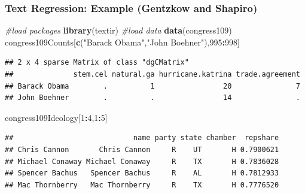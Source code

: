 \documentclass[
  shownotes,
  xcolor={svgnames},
  hyperref={colorlinks,citecolor=DarkBlue,linkcolor=DarkRed,urlcolor=DarkBlue}
  , aspectratio=169]{beamer}
\newenvironment{Shaded}{\begin{snugshade}}{\end{snugshade}}
\newcommand{\CommentTok}[1]{\textcolor[rgb]{0.56,0.35,0.01}{\textit{#1}}}
\newcommand{\DecValTok}[1]{\textcolor[rgb]{0.00,0.00,0.81}{#1}}
\newcommand{\KeywordTok}[1]{\textcolor[rgb]{0.13,0.29,0.53}{\textbf{#1}}}
\newcommand{\NormalTok}[1]{#1}
\newcommand{\OperatorTok}[1]{\textcolor[rgb]{0.81,0.36,0.00}{\textbf{#1}}}
\newcommand{\StringTok}[1]{\textcolor[rgb]{0.31,0.60,0.02}{#1}}
\begin{document}
\begin{frame}[fragile]
\frametitle{Text Regression: Example (Gentzkow and Shapiro)}
\begin{scriptsize}



\begin{Shaded}
\begin{Highlighting}[]
\CommentTok{\#load packages}
\KeywordTok{library}\NormalTok{(textir) }
\CommentTok{\#load data}
\KeywordTok{data}\NormalTok{(congress109)}
\NormalTok{congress109Counts[}\KeywordTok{c}\NormalTok{(}\StringTok{"Barack Obama"}\NormalTok{,}\StringTok{"John Boehner"}\NormalTok{),}\DecValTok{995}\OperatorTok{:}\DecValTok{998}\NormalTok{]}
\end{Highlighting}
\end{Shaded}

\end{scriptsize}
\begin{tiny}


\begin{verbatim}
## 2 x 4 sparse Matrix of class "dgCMatrix"
##              stem.cel natural.ga hurricane.katrina trade.agreement
## Barack Obama        .          1                20               7
## John Boehner        .          .                14               .
\end{verbatim}

\end{tiny}
\begin{scriptsize}


\begin{Shaded}
\begin{Highlighting}[]
\NormalTok{congress109Ideology[}\DecValTok{1}\OperatorTok{:}\DecValTok{4}\NormalTok{,}\DecValTok{1}\OperatorTok{:}\DecValTok{5}\NormalTok{]}
\end{Highlighting}
\end{Shaded}
\end{scriptsize}
\begin{tiny}


\begin{verbatim}
##                            name party state chamber  repshare
## Chris Cannon       Chris Cannon     R    UT       H 0.7900621
## Michael Conaway Michael Conaway     R    TX       H 0.7836028
## Spencer Bachus   Spencer Bachus     R    AL       H 0.7812933
## Mac Thornberry   Mac Thornberry     R    TX       H 0.7776520
\end{verbatim}
\end{tiny}
\end{frame}
\end{document}
